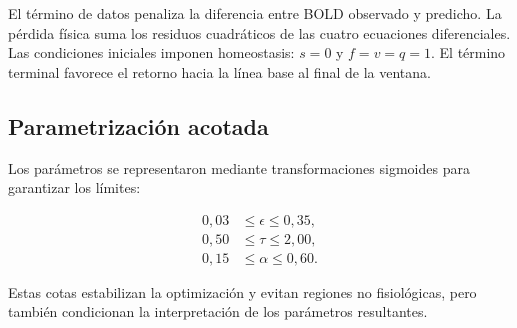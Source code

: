 El término de datos penaliza la diferencia entre BOLD observado y predicho. La pérdida física suma los residuos cuadráticos de las cuatro ecuaciones diferenciales. Las condiciones iniciales imponen homeostasis: $s=0$ y $f=v=q=1$. El término terminal favorece el retorno hacia la línea base al final de la ventana.

\subsection{Parametrización acotada}

Los parámetros se representaron mediante transformaciones sigmoides para garantizar los límites:

\begin{align}
0{,}03 &\leq \epsilon \leq 0{,}35, \\
0{,}50 &\leq \tau \leq 2{,}00, \\
0{,}15 &\leq \alpha \leq 0{,}60.
\end{align}

Estas cotas estabilizan la optimización y evitan regiones no fisiológicas, pero también condicionan la interpretación de los parámetros resultantes.
